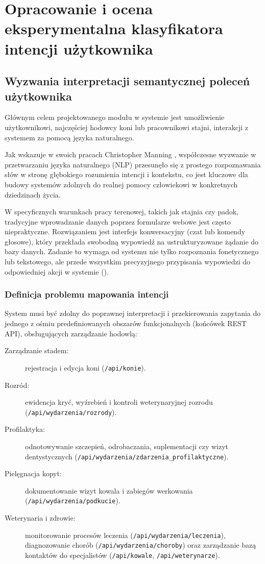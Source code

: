 \chapter{Opracowanie i ocena eksperymentalna klasyfikatora intencji użytkownika} \label{sec:klasyfikator}

\section{Wyzwania interpretacji semantycznej poleceń użytkownika}

Głównym celem projektowanego modułu  w systemie  jest umożliwienie użytkownikowi, najczęściej hodowcy koni lub pracownikowi stajni, interakcji z systemem za pomocą języka naturalnego. 

Jak wskazuje w swoich pracach Christopher Manning \cite{manning2008}, współczesne wyzwanie w przetwarzaniu języka naturalnego (NLP) przesunęło się z prostego rozpoznawania słów w stronę głębokiego rozumienia intencji i kontekstu, co jest kluczowe dla budowy systemów zdolnych do realnej pomocy człowiekowi w konkretnych dziedzinach życia.

W specyficznych warunkach pracy terenowej, takich jak stajnia czy padok, tradycyjne wprowadzanie danych poprzez formularze webowe jest często niepraktyczne. Rozwiązaniem jest interfejs konwersacyjny (czat lub komendy głosowe), który przekłada swobodną wypowiedź na ustrukturyzowane żądanie do bazy danych. Zadanie to wymaga od systemu nie tylko rozpoznania fonetycznego lub tekstowego, ale przede wszystkim precyzyjnego przypisania wypowiedzi do odpowiedniej akcji w systemie ().

\subsection*{Definicja problemu mapowania intencji}

System musi być zdolny do poprawnej interpretacji i przekierowania zapytania do jednego z ośmiu predefiniowanych obszarów funkcjonalnych (końcówek REST API), obsługujących zarządzanie hodowlą:
\begin{description}
    \item[Zarządzanie stadem:] rejestracja i edycja koni (\texttt{/api/konie}).
    \item[Rozród:] ewidencja kryć, wyźrebień i kontroli weterynaryjnej rozrodu (\texttt{/api/wydarzenia/rozrody}).
    \item[Profilaktyka:] odnotowywanie szczepień, odrobaczania, suplementacji czy wizyt dentystycznych (\texttt{/api/wydarzenia/zdarzenia\_profilaktyczne}).
    \item[Pielęgnacja kopyt:] dokumentowanie wizyt kowala i zabiegów werkowania (\texttt{/api/wydarzenia/podkucie}).
    \item[Weterynaria i zdrowie:] monitorowanie procesów leczenia (\texttt{/api/wydarzenia/leczenia}), diagnozowanie chorób (\texttt{/api/wydarzenia/choroby}) oraz zarządzanie bazą kontaktów do specjalistów (\texttt{/api/kowale}, \texttt{/api/weterynarze}).
\end{description}

